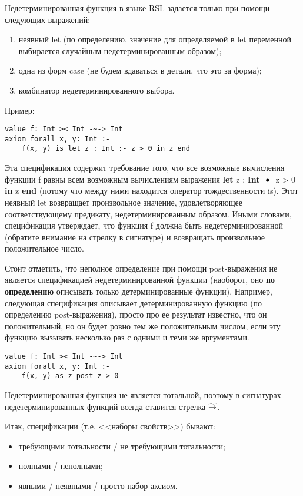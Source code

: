 
Недетерминированная функция в языке RSL задается только при помощи следующих выражений:
\begin{enumerate}
  \item неявный let (по определению, значение для определяемой в let переменной выбирается случайным недетерминированным образом);
  \item одна из форм case (не будем вдаваться в детали, что это за форма);
  \item комбинатор недетерминированного выбора.
\end{enumerate}

Пример:
\begin{lstlisting}
value f: Int >< Int -~-> Int
axiom forall x, y: Int :-
    f(x, y) is let z : Int :- z > 0 in z end
\end{lstlisting}

Эта спецификация содержит требование того, что все возможные вычисления функции f равны всем возможным вычислениям выражения \textbf{let} z : \textbf{Int} $~\mathop{\bullet}~$ z > 0 \textbf{in} z \textbf{end} (потому что между ними находится оператор тождественности is). Этот неявный let возвращает произвольное значение, удовлетворяющее соответствующему предикату, недетерминированным образом. Иными словами, спецификация утверждает, что функция f должна быть недетерминированной (обратите внимание на стрелку в сигнатуре) и возвращать произвольное положительное число.

Стоит отметить, что неполное определение при помощи post-выражения не является спецификацией недетерминированной функции (наоборот, оно \textbf{по определению} описывать только детерминированные функции). Например, следующая спецификация описывает детерминированную функцию (по определению post-выражения), просто про ее результат известно, что он положительный, но он будет ровно тем же положительным числом, если эту функцию вызывать несколько раз с одними и теми же аргументами.
\begin{lstlisting}
value f: Int >< Int -~-> Int
axiom forall x, y: Int :-
    f(x, y) as z post z > 0
\end{lstlisting}

Недетерминированная функция не является тотальной, поэтому в сигнатурах недетерминированных функций всегда ставится стрелка $\widetilde{\rightarrow}$.



Итак, спецификации (т.е. <<наборы свойств>>) бывают:
\begin{itemize}
  \item требующими тотальности / не требующими тотальности;
  \item полными / неполными;
  \item явными / неявными / просто набор аксиом.
\end{itemize}

